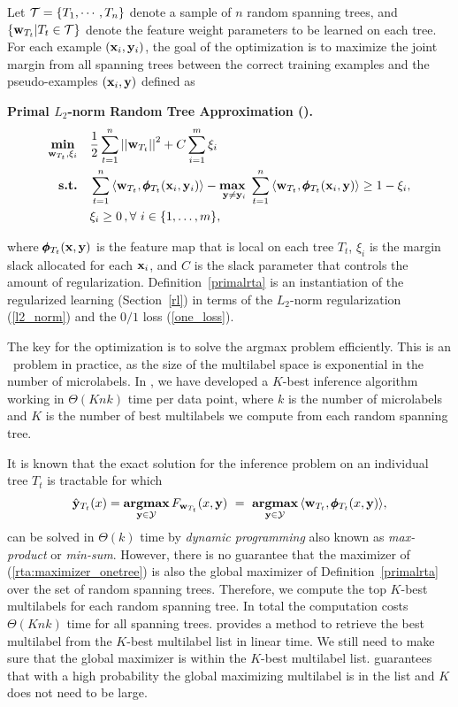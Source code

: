 {Let $\mathcal{T}=\{T_1,\cdots,T_n\}$ denote a sample of $n$ random spanning trees, and $\{\mathbf {w}_{T_t}|T_t\in\mathcal{T}\}$ denote the feature weight parameters to be learned on each tree.
For each example $(\mathbf {x}_i,\mathbf {y}_i)$, the goal of the optimization is to maximize the joint margin from all spanning trees between the correct training examples and the pseudo-examples $(\mathbf {x}_i,\mathbf {y})$ defined as
\begin{definition}{\bf Primal $L_2$-norm Random Tree Approximation (\rta).}\label{primalrta}
	\begin{align*}
		\underset{\vw_{T_t},\xi_i}{\minimize} & \quad \frac{1}{2}\sum_{t=1}^{n}\norm{\vw_{T_t}}^2 + C\sum_{i=1}^{m}\xi_i\\
		\st & \quad \sum_{t=1}^{n}{ \langle \vw_{T_t}, \phib_{T_t}(\vx_i,\vy_i) \rangle} - \underset{\vy \neq \vy_i}{\maximize\ } \sum_{t=1}^{n}{\langle \vw_{T_t}, \phib_{T_t}(\vx_i,\vy) \rangle } \geq 1 -  \xi_i, \\
		& \quad \xi_i\ge0\, , \forall\ i \in \set{1,\dots,m},
	\end{align*}
\end{definition}
\noindent
where $\pmb \phi_{T_t}(\mathbf {x},\mathbf {y})$ is the feature map that is local on each tree $T_t$, $\xi_i$ is the margin slack allocated for each $\mathbf {x}_i$, and $C$ is the slack parameter that controls the amount of regularization.
Definition~\ref{primalrta} is an instantiation of the regularized learning (Section~\ref{rl}) in terms of the $L_2$-norm regularization (\ref{l2_norm}) and the $0/1$ loss (\ref{one_loss}).

The key for the optimization is to solve the argmax problem efficiently.
This is an \nphard\ problem in practice, as the size of the multilabel space is exponential in the number of microlabels.
In , we have developed a $K$-best inference algorithm working in $\Theta(Knk)$ time per data point, where $k$ is the number of microlabels and $K$ is the number of best multilabels we compute from each random spanning tree.

It is known that the exact solution for the inference problem on an individual tree $T_t$ is tractable \citep{Koller09probabilistic} for which 
\begin{align}
	\hat{\mathbf {y}}_{T_t}(x) = \underset{\mathbf {y}\in\mathcal{Y}}{\textbf{argmax}}\, F_{\mathbf {w}_{T_t}}(x,\mathbf {y})\ =\ \underset{\mathbf {y}\in\mathcal{Y}}{\textbf{argmax}}\, \langle \mathbf {w}_{T_t}, \pmb \phi_{T_t}(x,\mathbf {y})\rangle, \label{rta:maximizer_onetree}
\end{align}
can be solved in $\Theta(k)$ time by \textit{dynamic programming} also known as \textit{max-product} or \textit{min-sum}.
However, there is no guarantee that the maximizer of (\ref{rta:maximizer_onetree}) is also the global maximizer of Definition~\ref{primalrta} over the set of random spanning trees.
Therefore, we compute the top $K$-best multilabels for each random spanning tree.
In total the computation costs $\Theta(Knk)$ time for all spanning trees.
 provides a method to retrieve the best multilabel from the $K$-best multilabel list in linear time.
We still need to make sure that the global maximizer is within the $K$-best multilabel list.
 guarantees that with a high probability the global maximizing multilabel is in the list and $K$ does not need to be large.

}
